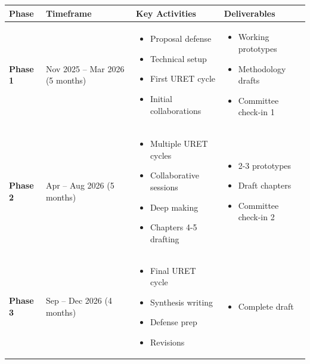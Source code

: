 \begin{table}[H]
	\centering
	\small
	\begin{tabular}{|l|p{3cm}|p{4cm}|p{5cm}|}
		\hline
		\textbf{Phase} & \textbf{Timeframe} & \textbf{Key Activities} & \textbf{Deliverables} \\
		\hline
		\rowcolor{blue!10}
		\textbf{Phase 1} & Nov 2025 – Mar 2026 (5 months) & 
		\begin{itemize}[nosep,leftmargin=*]
			\item Proposal defense
			\item Technical setup
			\item First URET cycle
			\item Initial collaborations
		\end{itemize} & 
		\begin{itemize}[nosep,leftmargin=*]
			\item Working prototypes
			\item Methodology drafts
			\item Committee check-in 1
		\end{itemize} \\
		\hline
		\rowcolor{green!10}
		\textbf{Phase 2} & Apr – Aug 2026 (5 months) & 
		\begin{itemize}[nosep,leftmargin=*]
			\item Multiple URET cycles
			\item Collaborative sessions
			\item Deep making
			\item Chapters 4-5 drafting
		\end{itemize} & 
		\begin{itemize}[nosep,leftmargin=*]
			\item 2-3 prototypes
			\item Draft chapters
			\item Committee check-in 2
		\end{itemize} \\
		\hline
		\rowcolor{orange!10}
		\textbf{Phase 3} & Sep – Dec 2026 (4 months) & 
		\begin{itemize}[nosep,leftmargin=*]
			\item Final URET cycle
			\item Synthesis writing
			\item Defense prep
			\item Revisions
		\end{itemize} & 
		\begin{itemize}[nosep,leftmargin=*]
			\item Complete draft

\end{itemize}
\end{tabular}
\end{table}
